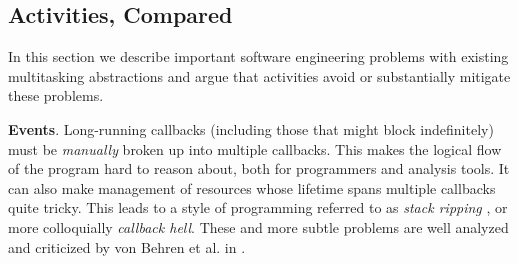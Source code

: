 \documentclass[9pt,preprint]{sigplanconf}
\begin{document}




\subsection{Activities, Compared}

In this section we describe important software engineering problems with existing multitasking abstractions and argue that activities avoid or substantially mitigate these problems.

\textbf{Events}.
Long-running callbacks (including those that might block indefinitely) must be \emph{manually} broken up into multiple callbacks.
This makes the logical flow of the program hard to reason about, both for programmers and analysis tools.
It can also make management of resources whose lifetime spans multiple callbacks quite tricky.
This leads to a style of programming referred to as \emph{stack ripping} \cite{Adya2002}, or more colloquially \emph{callback hell}.
These and more subtle problems are well analyzed and criticized by von Behren et al. in \cite{Behren2003a}.
\end{document}
